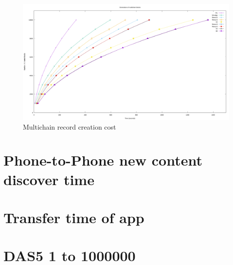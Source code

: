 \begin{figure}[h]
	\centering
	\includegraphics[width=\textwidth]{multichain_scale}
	\caption{Multichain record creation cost}
	\label{fig:multichain_scale}
\end{figure}



\section{Phone-to-Phone new content discover time}



\section{Transfer time of app}



\section{DAS5 1 to 1000000} 


